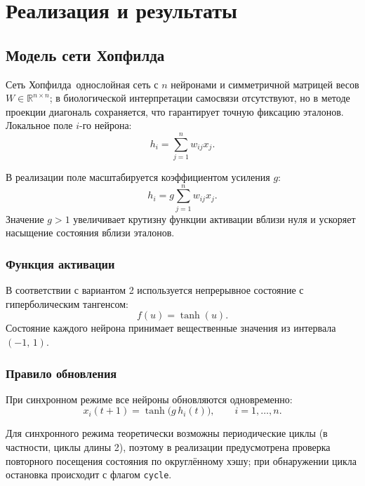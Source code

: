 \section{Реализация и результаты}
\label{sec:work}

\subsection{Модель сети Хопфилда}

Сеть Хопфилда~\mdash  однослойная сеть с $n$ нейронами и симметричной матрицей весов $W \in \mathbb{R}^{n \times n}$; в биологической интерпретации самосвязи отсутствуют, но в методе проекции диагональ сохраняется, что гарантирует точную фиксацию эталонов. Локальное поле $i$-го нейрона:
\begin{equation}
	h_i = \sum_{j=1}^{n} w_{ij} x_j.
\end{equation}

В реализации поле масштабируется коэффициентом усиления $g$:
\begin{equation}
	h_i = g \sum_{j=1}^{n} w_{ij} x_j.
\end{equation}
Значение $g > 1$ увеличивает крутизну функции активации вблизи нуля и ускоряет насыщение состояния вблизи эталонов.

\subsubsection{Функция активации}

В соответствии с вариантом 2 используется непрерывное состояние с гиперболическим тангенсом:
\begin{equation}
	f(u) = \tanh(u).
\end{equation}
Состояние каждого нейрона принимает вещественные значения из интервала $(-1,\,1)$.

\subsubsection{Правило обновления}

При синхронном режиме все нейроны обновляются одновременно:
\begin{equation}
	x_i(t+1) = \tanh\bigl(g\, h_i(t)\bigr), \qquad i = 1, \dots, n.
\end{equation}

Для синхронного режима теоретически возможны периодические циклы (в частности, циклы длины 2), поэтому в реализации предусмотрена проверка повторного посещения состояния по округлённому хэшу; при обнаружении цикла остановка происходит с флагом \texttt{cycle}.

